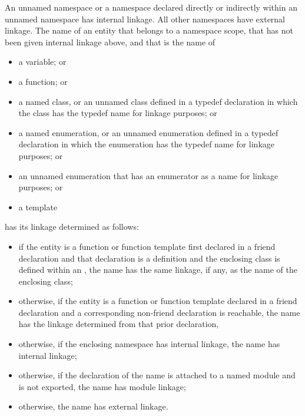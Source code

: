 \pnum
An unnamed namespace or a namespace declared directly or indirectly within an
unnamed namespace has internal linkage. All other namespaces have external linkage.
The name of an entity that belongs to a namespace scope,
that has not been given internal linkage above,
and that is the name of
\begin{itemize}
\item a variable; or
\item a function; or
\item
{}%
a named class, or an unnamed class defined in a
typedef declaration in which the class has the typedef name for linkage
purposes; or
\item
{}%
a named enumeration, or an unnamed enumeration defined
in a typedef declaration in which the enumeration has the typedef name
for linkage purposes; or
\item an unnamed enumeration
that has an enumerator as a name for linkage purposes; or
\item a template
\end{itemize}
has its linkage determined as follows:
\begin{itemize}
\item
{}%
if the entity is a function or function template
first declared in a friend declaration and
that declaration is a definition and
the enclosing class is defined within an ,
the name has the same linkage, if any,
as the name of the enclosing class;
\item
otherwise,
%
if the entity is a function or function template
declared in a friend declaration and
a corresponding non-friend declaration is reachable,
the name has the linkage determined from that prior declaration,
\item
otherwise,
if the enclosing namespace has internal linkage,
the name has internal linkage;
\item
otherwise,
if the declaration of the name is
attached to a named module
and is not exported,
the name has module linkage;
\item
otherwise,
the name has external linkage.
\end{itemize}

